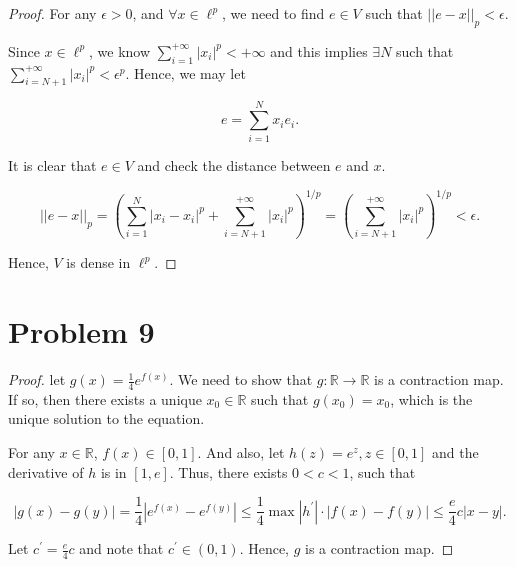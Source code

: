 \documentclass[12pt]{article}
\begin{document}
\begin{proof}

For any $\epsilon>0$, and $\forall x\in \ell^p$, we need to find $e \in V$ such that $||e-x||_p < \epsilon$.

Since $x\in\ell^p$, we know $\sum_{i=1}^{+\infty} |x_i|^p < +\infty$ and this implies $\exists N$ such that $\sum_{i=N+1}^{+\infty} |x_i|^p < \epsilon^p$. Hence, we may let 

$$
e = \sum_{i=1}^{N} x_i e_i. 
$$

It is clear that $e\in V$ and check the distance between $e$ and $x$.

$$
||e-x||_p = \left( \sum_{i=1}^{N} |x_i -x_i|^p + \sum_{i=N+1}^{+\infty} |x_i|^p \right)^{1/p} = \left( \sum_{i=N+1}^{+\infty} |x_i|^p \right)^{1/p}<\epsilon.
$$

Hence, $V$ is dense in $\ell^p$.

\end{proof}




\vspace{60mm}


\section*{Problem 9}

\begin{proof}

let $g(x) = \frac{1}{4} e^{f(x)}$. We need to show that $g: \mathbb{R} \rightarrow \mathbb{R}$ is a contraction map. If so, then there exists a unique $x_0\in\mathbb{R}$ such that $g(x_0) = x_0$, which is the unique solution to the equation.

For any $x\in \mathbb{R}$, $f(x) \in [0, 1]$. And also, let $h(z) = e^z, z\in [0, 1]$ and the derivative of $h$ is in $[1, e]$. Thus, there exists $0<c<1$, such that

$$
|g(x) - g(y)| = \frac{1}{4}|e^{f(x)} - e^{f(y)}| \leqslant \frac{1}{4}\max |h^\prime|\cdot |f(x) - f(y)| \leqslant \frac{e}{4}c|x-y|.
$$

Let $c^\prime = \frac{e}{4}c$ and note that $c^\prime \in (0, 1)$. Hence, $g$ is a contraction map.


\end{proof}
\end{document}
